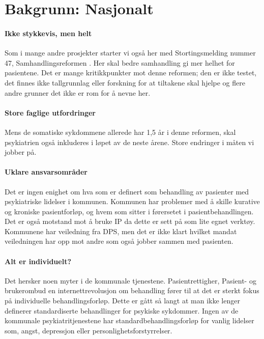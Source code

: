 \documentclass[11pt]{report} %
\begin{document}
                \section{Bakgrunn: Nasjonalt}\label{sec:ov_bakg}
                  \paragraph{Ikke stykkevis, men helt\\}
                    Som i mange andre prosjekter starter vi også her med Stortingsmelding nummer 47, Samhandlingsreformen
                    \cite{Stmld47}. Her skal bedre samhandling gi mer helhet for pasientene. Det er mange kritikkpunkter mot denne reformen; den er ikke testet, det finnes ikke tallgrunnlag eller forskning for at tiltakene skal hjelpe og flere andre grunner det ikke er rom for å nevne her.
                  \paragraph{Store faglige utfordringer\\}
                    Mens de somatiske sykdommene allerede har 1,5 år i denne reformen, skal psykiatrien også inkluderes i løpet av de neste årene. Store endringer i måten vi jobber på.
                  \paragraph{Uklare ansvarsområder\\}  
                    Det er ingen enighet om hva som er definert som behandling av pasienter med psykiatriske lidelser i kommunen. Kommunen har problemer med å skille kurative og kroniske pasientforløp, og hvem som sitter i førersetet i pasientbehandlingen. Det er også motstand mot å bruke IP da dette er sett på som lite egnet verktøy. Kommunene har veiledning fra DPS, men det er ikke klart hvilket mandat veiledningen har opp mot andre som også jobber sammen med pasienten. 
                  \paragraph{Alt er individuelt?\\}
                    Det hersker noen myter i de kommunale tjenestene. Pasientrettigher, Pasient- og brukerombud en internettrevolusjon om behandling fører til at det er sterkt fokus på individuelle behandlingsforløp. Dette er gått så langt at man ikke lenger definerer standardiserte behandlinger for psykiske sykdommer. Ingen av de kommunale psykiatritjenestene har standardbehandlingsforløp for vanlig lidelser som, angst, depressjon eller personlighetsforstyrrelser.
\end{document}
